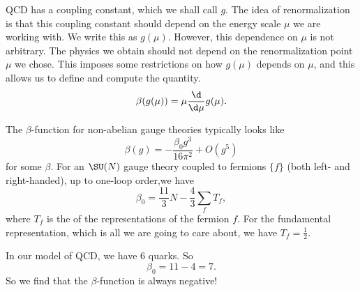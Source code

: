 \documentclass[a4paper]{article}
\begin{document}
QCD has a coupling constant, which we shall call $g$. The idea of renormalization is that this coupling constant should depend on the energy scale $\mu$ we are working with. We write this as $g(\mu)$. However, this dependence on $\mu$ is not arbitrary. The physics we obtain should not depend on the renormalization point $\mu$ we chose. This imposes some restrictions on how $g(\mu)$ depends on $\mu$, and this allows us to define and compute the quantity.
\[
  \beta(g(\mu)) = \mu \frac{\d}{\d \mu} g(\mu).
\]
%
%
%

The $\beta$-function for non-abelian gauge theories typically looks like
\[
  \beta(g) = - \frac{\beta_0 g^3}{16 \pi^2} + O(g^5)
\]
for some $\beta$. For an $\SU(N)$ gauge theory coupled to fermions $\{f\}$ (both left- and right-handed), up to one-loop order,we have
\[
  \beta_0 = \frac{11}{3}N - \frac{4}{3} \sum_f T_f,
\]
where $T_f$ is the  of the representations of the fermion $f$. For the fundamental representation, which is all we are going to care about, we have $T_f = \frac{1}{2}$.
%

In our model of QCD, we have $6$ quarks. So
\[
  \beta_0 = 11 - 4 = 7.
\]
So we find that the $\beta$-function is always negative!
\end{document}
